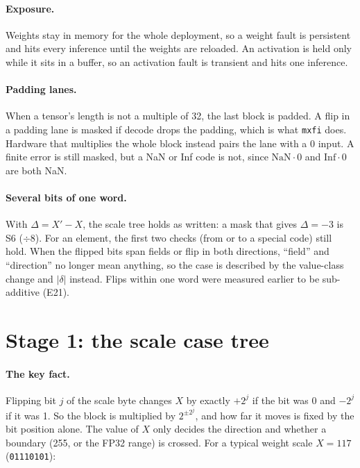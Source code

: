 \documentclass[10pt,a4paper]{article}
\begin{document}
\paragraph{Exposure.} Weights stay in memory for the whole deployment, so a weight fault is
persistent and hits every inference until the weights are reloaded. An activation is held only
while it sits in a buffer, so an activation fault is transient and hits one inference.

\paragraph{Padding lanes.} When a tensor's length is not a multiple of 32, the last block is
padded. A flip in a padding lane is masked if decode drops the padding, which is what
\texttt{mxfi} does. Hardware that multiplies the whole block instead pairs the lane with a 0
input. A finite error is still masked, but a NaN or Inf code is not, since $\text{NaN}\cdot 0$ and
$\text{Inf}\cdot 0$ are both NaN.

\paragraph{Several bits of one word.} With $\Delta = X'-X$, the scale tree holds as written: a
mask that gives $\Delta=-3$ is S6 ($\div 8$). For an element, the first two checks (from or to a
special code) still hold. When the flipped bits span fields or flip in both directions,
``field'' and ``direction'' no longer mean anything, so the case is described by the value-class
change and $|\delta|$ instead. Flips within one word were measured earlier to be sub-additive (E21).

\section{Stage 1: the scale case tree}

\paragraph{The key fact.} Flipping bit $j$ of the scale byte changes $X$ by exactly $+2^j$ if the
bit was 0 and $-2^j$ if it was 1. So the block is multiplied by $2^{\pm 2^j}$, and how far it
moves is fixed by the bit position alone. The value of $X$ only decides the direction and whether
a boundary (255, or the FP32 range) is crossed. For a typical weight scale $X=117$
(\texttt{01110101}):
\end{document}
